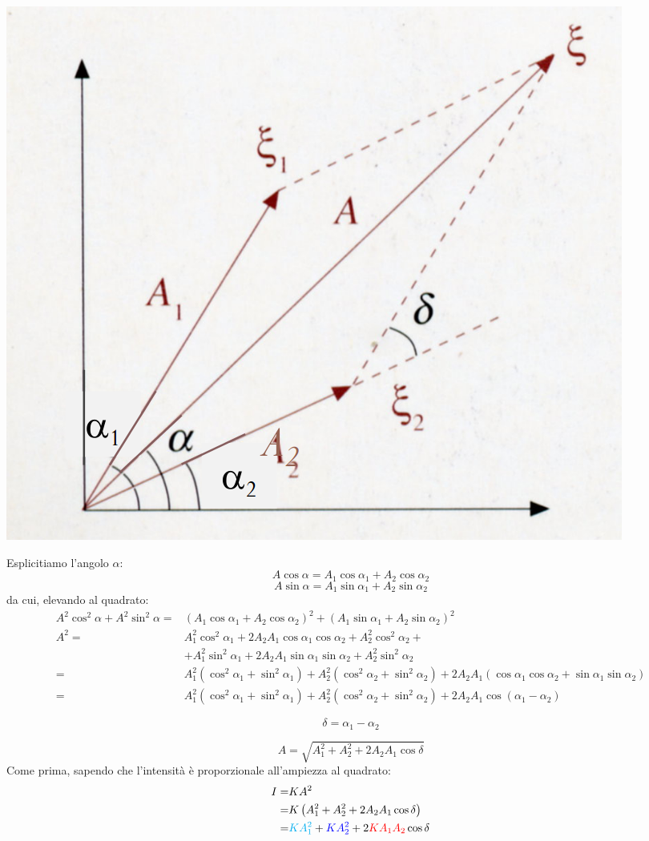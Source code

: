 \documentclass[x11names]{report}
\begin{document}
	\begin{center}
		\includegraphics[scale=0.2]{imgs/intervec.png}
	\end{center}
	
	Esplicitiamo l'angolo \(\alpha\):
	\[ 
	A\cos\alpha = A_1\cos\alpha_1 + A_2\cos\alpha_2		
	\]
	\[ 
	A\sin\alpha = A_1\sin\alpha_1 + A_2\sin\alpha_2		
	\]
	da cui, elevando al quadrato:
	\begin{align*} 
		A^2\cos^2\alpha + A^2\sin^2\alpha =& (A_1\cos\alpha_1 + A_2\cos\alpha_2)^2 + (A_1\sin\alpha_1 + A_2\sin\alpha_2)^2\\
		A^2 =& A_1^2\cos^2\alpha_1 + 2A_2A_1\cos\alpha_1\cos\alpha_2 + A_2^2\cos^2\alpha_2 + \\ &+ A_1^2\sin^2\alpha_1 + 2A_2A_1\sin\alpha_1\sin\alpha_2 + A_2^2\sin^2\alpha_2\\
		=& A_1^2(\cos^2\alpha_1 + \sin^2\alpha_1) + A_2^2(\cos^2\alpha_2 + \sin^2\alpha_2) + 2A_2A_1(\cos\alpha_1\cos\alpha_2 + \sin\alpha_1\sin\alpha_2)\\
		=&  A_1^2(\cos^2\alpha_1 + \sin^2\alpha_1) + A_2^2(\cos^2\alpha_2 + \sin^2\alpha_2) +  2A_2A_1\cos\left(\alpha_1 - \alpha_2\right)
	\end{align*} 
	
	\[ 
	\boxed{\delta = \alpha_1 - \alpha_2}
	\]
	
	\begin{equation}
		A = \sqrt{A_1^2 + A_2^2 + 2A_2A_1\cos\delta}
	\end{equation}
	Come prima, sapendo che l'intensità è proporzionale all'ampiezza al quadrato:
	\begin{align*}
		I =& KA^2 \\ 
		=& K\left(A_1^2 + A_2^2 + 2A_2A_1\cos\delta\right)\\
		=& \textcolor{cyan}{KA_1^2} + \textcolor{blue}{KA_2^2} + 2\textcolor{red}{KA_1A_2}\cos\delta
	\end{align*}
	
\end{document}
